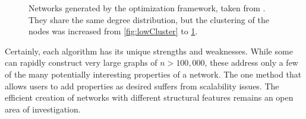 \documentclass[11pt]{article}
\begin{document}
\begin{figure}[h!]
\begin{subfigure}{.35\textwidth}
    \caption{}
    \label{fig:highCluster}
  \end{subfigure}%
  \caption{Networks generated by the optimization framework, taken from \cite{Gounaris2013}. They share the same degree distribution, but the clustering of the nodes was increased from \ref{fig:lowCluster} to \ref{fig:highCluster}.}
  \label{fig:optCluster}
\end{figure}

\vspace{1mm}
\indent Certainly, each algorithm has its unique strengths and weaknesses. While some can rapidly construct very large graphs of $n>100,000$, these address only a few of the many potentially interesting properties of a network. The one method that allows users to add properties as desired suffers from scalability issues. The efficient creation of networks with different structural features remains an open area of investigation.
\end{document}
